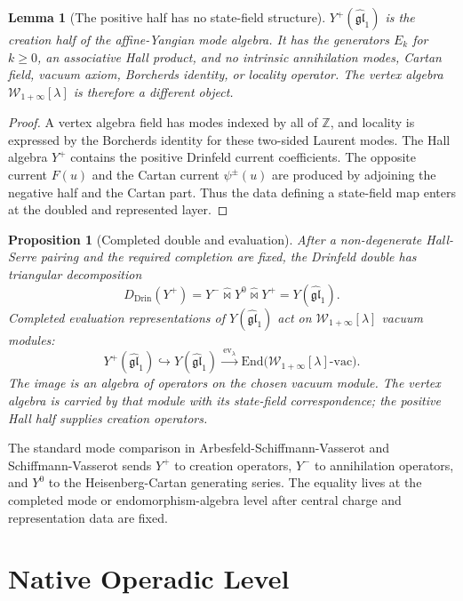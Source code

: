 \documentclass[11pt]{article}
\newtheorem{proposition}[theorem]{Proposition}
\newtheorem{lemma}[theorem]{Lemma}
\providecommand{\gglone}{\widehat{\mathfrak{gl}}_{1}}
\providecommand{\Yp}{Y^{+}}
\providecommand{\Ym}{Y^{-}}
\providecommand{\Yz}{Y^{0}}
\providecommand{\YFull}{Y}
\providecommand{\Wilpha}{\mathcal{W}_{1+\infty}}
\providecommand{\End}{\mathrm{End}}
\begin{document}
\begin{lemma}[The positive half has no state-field structure]
\label{lem:positive-half-no-voa}
$\Yp(\gglone)$ is the creation half of the affine-Yangian mode algebra.
It has the generators $E_k$ for $k\geq 0$, an associative Hall product,
and no intrinsic annihilation modes, Cartan field, vacuum axiom,
Borcherds identity, or locality operator. The vertex algebra
$\Wilpha[\lambda]$ is therefore a different object.
\end{lemma}

\begin{proof}
A vertex algebra field has modes indexed by all of $\mathbb{Z}$, and
locality is expressed by the Borcherds identity for these two-sided
Laurent modes. The Hall algebra $\Yp$ contains the positive
Drinfeld current coefficients. The opposite current $F(u)$ and the
Cartan current $\psi^\pm(u)$ are produced by adjoining the
negative half and the Cartan part. Thus the data defining a state-field
map enters at the doubled and represented layer.
\end{proof}

\begin{proposition}[Completed double and evaluation]
\label{prop:completed-double-evaluation}
After a non-degenerate Hall-Serre pairing and the required completion
are fixed, the Drinfeld double has triangular decomposition
\[
D_{\mathrm{Drin}}(\Yp)
=\Ym\widehat{\bowtie}\Yz\widehat{\bowtie}\Yp
=\YFull(\gglone).
\]
Completed evaluation representations of $\YFull(\gglone)$ act on
$\Wilpha[\lambda]$ vacuum modules:
\[
\Yp(\gglone)
\hookrightarrow
\YFull(\gglone)
\xrightarrow{\ \mathrm{ev}_{\lambda}\ }
\End\bigl(\Wilpha[\lambda]\text{-}\mathrm{vac}\bigr).
\]
The image is an algebra of operators on the chosen vacuum module. The
vertex algebra is carried by that module with its state-field
correspondence; the positive Hall half supplies creation operators.
\end{proposition}

The standard mode comparison in Arbesfeld-Schiffmann-Vasserot and
Schiffmann-Vasserot sends $\Yp$ to creation operators, $\Ym$ to
annihilation operators, and $\Yz$ to the Heisenberg-Cartan generating
series. The equality lives at the completed mode or
endomorphism-algebra level after central charge and representation data
are fixed.

\section{Native Operadic Level}
\end{document}
